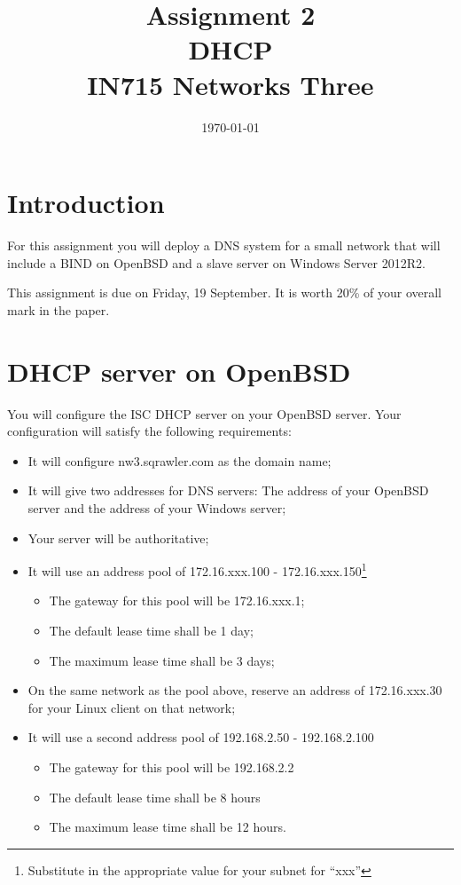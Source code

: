 \documentclass{article}
\begin{document}
\title{ Assignment 2 \\ DHCP \\ IN715 Networks Three}
\date{\today}
\maketitle

\section*{Introduction}
For this assignment you will deploy a DNS system for a small network that will include a BIND on OpenBSD and a slave server on Windows Server 2012R2.

This assignment is due on Friday, 19 September.  It is worth 20\% of your overall mark in the paper.

\section{DHCP server on OpenBSD}
You will configure the ISC DHCP server on your OpenBSD server.  Your configuration will satisfy the following requirements:

\begin{itemize}
  \item It will configure nw3.sqrawler.com as the domain name;
  \item It will give two addresses for DNS servers: The address of your OpenBSD server and the address of your Windows server;
  \item Your server will be authoritative;
  \item It will use an address pool of 172.16.xxx.100 - 172.16.xxx.150\footnote{Substitute in the appropriate value for your subnet for ``xxx''}
    \begin{itemize}
      \item The gateway for this pool will be 172.16.xxx.1;
      \item The default lease time shall be 1 day;
      \item The maximum lease time shall be 3 days;
    \end{itemize}
  \item On the same network as the pool above, reserve an address of
        172.16.xxx.30 for your Linux client on that network;
  \item It will use a second  address pool of 192.168.2.50 - 192.168.2.100
    \begin{itemize}
      \item The gateway for this pool will be 192.168.2.2
      \item The default lease time shall be 8 hours
      \item The maximum lease time shall be 12 hours.
    \end{itemize}
\end{itemize}
\end{document}
